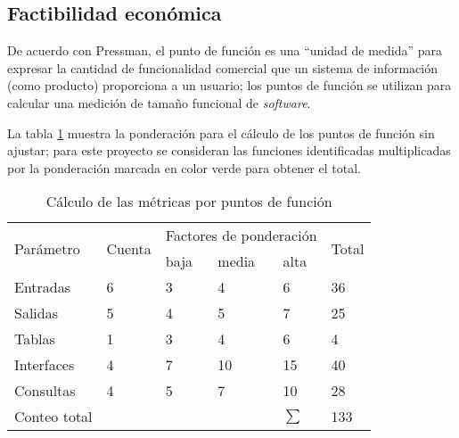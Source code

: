 \subsection{Factibilidad económica}

De acuerdo con Pressman\cite{pressman_software_2005}, el punto de función es una ``unidad de medida'' para expresar la cantidad de funcionalidad comercial que un sistema de información (como producto) proporciona a un usuario; los puntos de función se utilizan para calcular una medición de tamaño funcional de \textit{software}.

La tabla \ref{tab:function_point_metrics} muestra la ponderación para el cálculo de los puntos de función sin ajustar; para este proyecto se consideran las funciones identificadas multiplicadas por la ponderación marcada en color verde para obtener el total.


\begin{table}[H]
	\centering
	\begin{tabular}{|l|l|l|l|l|l|}
	\hline
	\multirow{2}{*}{Parámetro} & \multirow{2}{*}{Cuenta} & \multicolumn{3}{|l|}{Factores de ponderación} & \multirow{2}{*}{Total} \\ \cline{3-5}
														 &                         & baja       	& media       & alta		       &                        \\ \hline
	Entradas                   & 6                       & 3            & 4           & \cellcolor[HTML]{66BB6A} 6              & 36 \\ \hline
	Salidas                     & 5                       & 4            & \cellcolor[HTML]{66BB6A} 5           & 7              & 25 \\ \hline
	Tablas                     & 1                       & 3            &\cellcolor[HTML]{66BB6A} 4           & 6              & 4 \\ \hline
	Interfaces                 & 4                       & 7            &\cellcolor[HTML]{66BB6A} 10          & 15             & 40 \\ \hline
	Consultas                  & 4                       & 5            &\cellcolor[HTML]{66BB6A} 7           & 10             & 28 \\ \hline
	Conteo total               &                         &              &             &		    $ \sum $         &\cellcolor[HTML]{66BB6A} 133 \\ \hline
	\end{tabular}
	\caption{Cálculo de las métricas por puntos de función}
	\label{tab:function_point_metrics}
\end{table}



